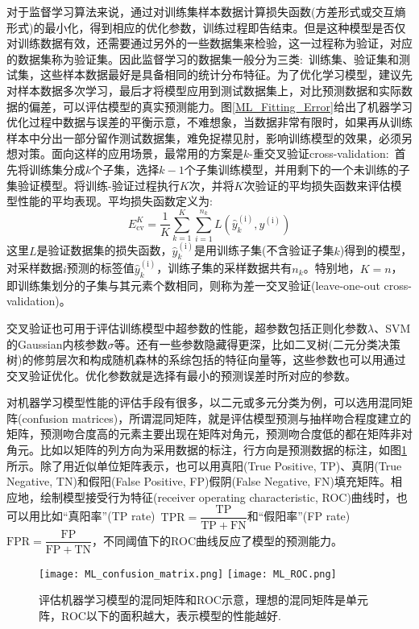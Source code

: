 \documentclass[10pt, oneside, a4paper]{article}      %
\begin{document}
对于监督学习算法来说，通过对训练集样本数据计算损失函数(方差形式或交互熵形式)的最小化，得到相应的优化参数，训练过程即告结束。但是这种模型是否仅对训练数据有效，还需要通过另外的一些数据集来检验，这一过程称为验证，对应的数据集称为验证集。因此监督学习的数据集一般分为三类:~训练集、验证集和测试集，这些样本数据最好是具备相同的统计分布特征。为了优化学习模型，建议先对样本数据多次学习，最后才将模型应用到测试数据集上，对比预测数据和实际数据的偏差，可以评估模型的真实预测能力。图\ref{ML_Fitting_Error}给出了机器学习优化过程中数据与误差的平衡示意，不难想象，当数据非常有限时，如果再从训练样本中分出一部分留作测试数据集，难免捉襟见肘，影响训练模型的效果，必须另想对策。面向这样的应用场景，最常用的方案是$k$-重交叉验证\textrm{cross-validation}:~首先将训练集分成$k$个子集，选择$k-1$个子集训练模型，并用剩下的一个未训练的子集验证模型。将训练-验证过程执行$K$次，并将$K$次验证的平均损失函数来评估模型性能的平均表现。平均损失函数定义为:
\begin{displaymath}
	E_{\mathrm{cv}}^{K}=\dfrac1K\sum_{k=1}^K\sum_{i=1}^{n_k}L(\hat{y}_k^{(\mathrm{i})},y^{(\mathrm{i})})
\end{displaymath}
这里$L$是验证数据集的损失函数，$\hat{y}_k^{(\mathrm{i})}$是用训练子集(不含验证子集$k$)得到的模型，对采样数据$i$预测的标签值$\hat{y}_k^{(\mathrm{i})}$，训练子集的采样数据共有$n_k$。特别地，$K=n$，即训练集划分的子集与其元素个数相同，则称为差一交叉验证\textrm{(leave-one-out cross-validation)}。


交叉验证也可用于评估训练模型中超参数的性能，超参数包括正则化参数$\lambda$、\textrm{SVM}的\textrm{Gaussian}内核参数$\sigma$等。还有一些参数隐藏得更深，比如二叉树(二元分类决策树)的修剪层次和构成随机森林的系综包括的特征向量等，这些参数也可以用通过交叉验证优化。优化参数就是选择有最小的预测误差时所对应的参数。

对机器学习模型性能的评估手段有很多，以二元或多元分类为例，可以选用混同矩阵\textrm{(confusion matrices)}，所谓混同矩阵，就是评估模型预测与抽样吻合程度建立的矩阵，预测吻合度高的元素主要出现在矩阵对角元，预测吻合度低的都在矩阵非对角元。比如以矩阵的列方向为采用数据的标注，行方向是预测数据的标注，如图\ref{ML_CM_ROC}所示。除了用近似单位矩阵表示，也可以用真阳\textrm{(True Positive, TP)}、真阴\textrm{(True Negative, TN)}和假阳\textrm{(False Positive, FP)}假阴\textrm{(False Negative, FN)}填充矩阵。相应地，绘制模型接受行为特征\textrm{(receiver operating characteristic, ROC)}曲线时，也可以用比如“真阳率”\textrm{(TP rate)}~$\mathrm{TPR}=\dfrac{\mathrm{TP}}{\mathrm{TP}+\mathrm{FN}}$和“假阳率”\textrm{(FP rate)}~$\mathrm{FPR}=\dfrac{\mathrm{FP}}{\mathrm{FP}+\mathrm{TN}}$，不同阈值下的\textrm{ROC}曲线反应了模型的预测能力。
\begin{figure}[h!]
\centering
\vspace*{-0.1in}
\texttt{[image: ML\_confusion\_matrix.png]}
\hskip 5pt
\texttt{[image: ML\_ROC.png]}
\caption{评估机器学习模型的混同矩阵和\textrm{ROC}示意，理想的混同矩阵是单元阵，\textrm{ROC}以下的面积越大，表示模型的性能越好.}%
\label{ML_CM_ROC}
\end{figure}
\end{document}
